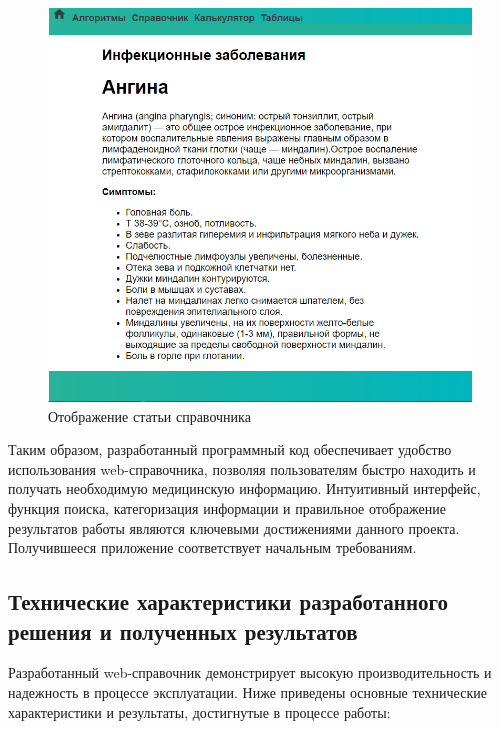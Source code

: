 \begin{itemize}
\begin{figure}
  \includegraphics[scale=0.6]{styles/diploma/inc/Статья.png}
  \caption{Отображение статьи справочника}
  \label{fig:article}
\end{figure}

\end{itemize}

Таким образом, разработанный программный код обеспечивает удобство использования web-справочника, позволяя пользователям быстро находить и получать необходимую медицинскую информацию. Интуитивный интерфейс, функция поиска, категоризация информации и правильное отображение результатов работы являются ключевыми достижениями данного проекта. Получившееся приложение соответствует начальным требованиям.

\subsection{Технические характеристики разработанного решения и полученных результатов}

Разработанный web-справочник демонстрирует высокую производительность и надежность в процессе эксплуатации. Ниже приведены основные технические характеристики и результаты, достигнутые в процессе работы:

